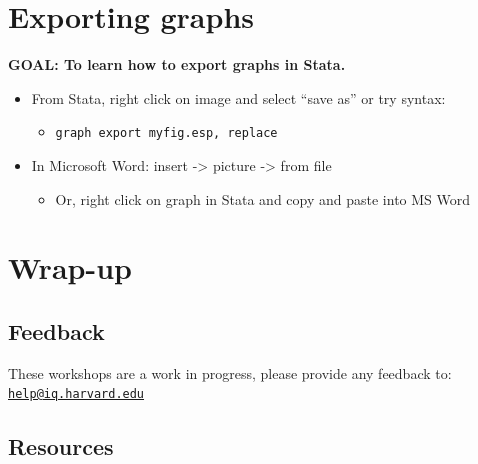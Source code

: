 \documentclass[
]{book}
\providecommand{\tightlist}{%
  \setlength{\itemsep}{0pt}\setlength{\parskip}{0pt}}
\begin{document}
\hypertarget{exporting-graphs}{%
\section{Exporting graphs}\label{exporting-graphs}}

\begin{alert}

\textbf{GOAL: To learn how to export graphs in Stata.}

\end{alert}

\begin{itemize}
\tightlist
\item
  From Stata, right click on image and select ``save as'' or try syntax:

  \begin{itemize}
  \tightlist
  \item
    \texttt{graph\ export\ myfig.esp,\ replace}
  \end{itemize}
\item
  In Microsoft Word: insert -\textgreater{} picture -\textgreater{} from file

  \begin{itemize}
  \tightlist
  \item
    Or, right click on graph in Stata and copy and paste into MS Word
  \end{itemize}
\end{itemize}

\hypertarget{wrap-up-10}{%
\section{Wrap-up}\label{wrap-up-10}}

\hypertarget{feedback-10}{%
\subsection{Feedback}\label{feedback-10}}

These workshops are a work in progress, please provide any feedback to: \href{mailto:help@iq.harvard.edu}{\nolinkurl{help@iq.harvard.edu}}

\hypertarget{resources-13}{%
\subsection{Resources}\label{resources-13}}
\end{document}
